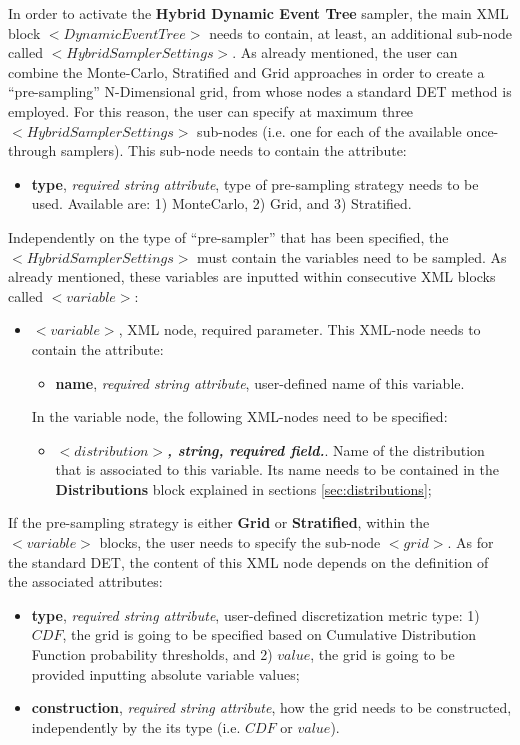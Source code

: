 In order to activate the \textbf{Hybrid Dynamic Event Tree}  sampler, the main XML block $<DynamicEventTree>$ needs to contain, at least, an additional sub-node called $<HybridSamplerSettings>$. As already mentioned, the user can combine the Monte-Carlo, Stratified and Grid approaches in order to create a ``pre-sampling'' N-Dimensional grid, from whose nodes a standard DET method is employed. For this reason, the user can specify at maximum three $<HybridSamplerSettings>$ sub-nodes (i.e. one for each of the available once-through samplers).
 This sub-node needs to contain the attribute:
\begin{itemize}
  \item \textbf{type}, \textit{required string attribute}, type of pre-sampling strategy needs to be used. Available are: 1) MonteCarlo, 2) Grid, and 3) Stratified.
 \end{itemize}
Independently on the type of ``pre-sampler'' that has been specified, the $<HybridSamplerSettings>$  must contain the  variables need to be sampled. As already mentioned, these variables are inputted within consecutive XML blocks called $<variable>$:
\begin{itemize}
\item $<variable>$, XML node, required parameter. This XML-node needs to contain the attribute:
\begin{itemize}
  \item \textbf{name}, \textit{required string attribute}, user-defined name of this variable.
 \end{itemize}
 In the variable node, the following XML-nodes need to be specified:
 \begin{itemize}
    \item $<distribution>$\textbf{\textit{, string, required field.}}. Name of the distribution that is associated to this variable. Its name needs to be contained in the \textbf{Distributions} block explained in sections \ref{sec:distributions};
  \end{itemize}
 \end{itemize}
If the pre-sampling strategy is either \textbf{Grid} or \textbf{Stratified}, within the $<variable>$ blocks, the user needs to specify the sub-node $<grid>$. As for the standard DET, the content of this XML node depends on the definition of the associated attributes:
\begin{itemize}
\itemsep0em
\item \textbf{type}, \textit{required string attribute}, user-defined discretization metric type: 1) $CDF$, the grid is going to be specified based on  Cumulative Distribution Function probability thresholds, and 2) $value$, the grid is going to be provided inputting absolute variable values;
\item \textbf{construction}, \textit{required string attribute}, how the grid needs to be constructed, independently by the its type (i.e. $CDF$ or $value$).
\end{itemize}
